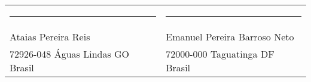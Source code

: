 \noindent \bigskip{}

%

%
%

\noindent \begin{tabular}{ll}
	\rule[0.5ex]{0.5\columnwidth}{1pt} & \rule[0.5ex]{0.5\columnwidth}{1pt}\\
	Ataias Pereira Reis & Emanuel Pereira Barroso Neto\\
	72926-048 Águas Lindas \textendash{} GO \textendash{} Brasil & 72000-000 Taguatinga \textendash{} DF \textendash{} Brasil
\end{tabular}